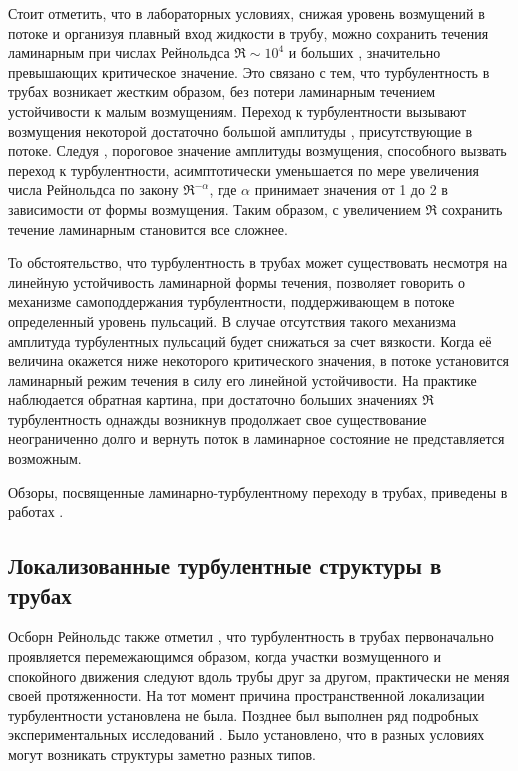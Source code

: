 Стоит отметить, что в лабораторных условиях, снижая уровень возмущений в потоке и организуя плавный вход жидкости в трубу, можно сохранить течения ламинарным при числах Рейнольдса $\Re \sim 10^4$ и больших \cite{Wygnanski1973, Darbyshire1995, vanDoorne2009}, значительно превышающих критическое значение. Это связано с тем, что турбулентность в трубах возникает жестким образом, без потери ламинарным течением устойчивости к малым возмущениям. Переход к турбулентности вызывают возмущения некоторой достаточно большой амплитуды \cite{Grossmann2000}, присутствующие в потоке. Следуя \cite{Darbyshire1995, Hof2003, Peixinho2007, Mellibovsky2009critical}, пороговое значение амплитуды возмущения, способного вызвать переход к турбулентности, асимптотически уменьшается по мере увеличения числа Рейнольдса по закону $\Re^{-\alpha}$, где $\alpha$ принимает значения от 1 до 2 в зависимости от формы возмущения. Таким образом, с увеличением $\Re$ сохранить течение ламинарным становится все сложнее. 

То обстоятельство, что турбулентность в трубах может существовать несмотря на линейную устойчивость ламинарной формы течения, позволяет говорить о механизме самоподдержания турбулентности, поддерживающем в потоке определенный уровень пульсаций. В случае отсутствия такого механизма амплитуда турбулентных пульсаций будет снижаться за счет вязкости. Когда её величина окажется ниже некоторого критического значения, в потоке установится ламинарный режим течения в силу его линейной устойчивости. На практике наблюдается обратная картина, при достаточно больших значениях $\Re$ турбулентность однажды возникнув продолжает свое существование неограниченно долго и вернуть поток в ламинарное состояние не представляется возможным. 

Обзоры, посвященные ламинарно-турбулентному переходу в трубах, приведены в работах \cite{Kerswell2005, Manneville2016, Kreilos2014, Barkley2016}. 


	\subsection{Локализованные турбулентные структуры в трубах}

Осборн Рейнольдс также отметил \cite{Reynolds1883}, что турбулентность в трубах первоначально проявляется перемежающимся образом, когда участки возмущенного и спокойного движения следуют вдоль трубы друг за другом, практически не меняя своей протяженности. На тот момент причина пространственной локализации турбулентности установлена не была. Позднее был выполнен ряд подробных экспериментальных исследований \cite{Lindgren1969, Wygnanski1973, Wygnanski1975, Bandyopadhyay1986, Darbyshire1995, vanDoorne2009}. 
Было установлено, что в разных условиях могут возникать структуры заметно разных типов.


